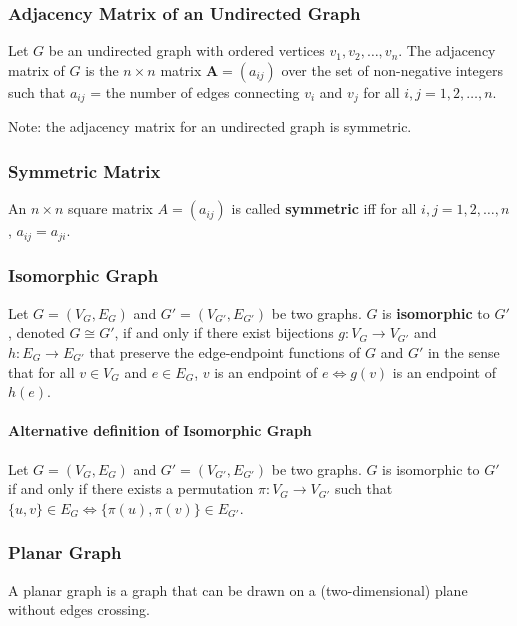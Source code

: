 \documentclass{article}
\theoremstyle{plain}
\theoremstyle{definition}
\theoremstyle{remark}
\begin{document}
\subsubsection*{Adjacency Matrix of an Undirected Graph}
Let $G$ be an undirected graph with ordered vertices $v_1, v_2, \dots, v_n$. The adjacency matrix of $G$ is the $n \times n$ matrix $\mathbf{A} = (a_{ij})$ over the set of non-negative integers such that $a_{ij}$ = the number of edges connecting $v_i$ and $v_j$ for all $i,j = 1,2,\dots,n$.
 
Note: the adjacency matrix for an undirected graph is symmetric.
 
\subsubsection*{Symmetric Matrix}
An $n \times n$ square matrix $A = (a_{ij})$ is called \textbf{symmetric} iff for all $i,j = 1,2,\dots,n$, $a_{ij} = a_{ji}$.


 
\subsubsection*{Isomorphic Graph}
Let $G = (V_G, E_G)$ and $G' = (V_{G'}, E_{G'})$ be two graphs. $G$ is \textbf{isomorphic} to $G'$, denoted $G \cong G'$, if and only if there exist bijections $g: V_G \to V_{G'}$ and $h: E_G \to E_{G'}$ that preserve the edge-endpoint functions of $G$ and $G'$ in the sense that for all $v \in V_G$ and $e \in E_G$, $v$ is an endpoint of $e \Leftrightarrow g(v)$ is an endpoint of $h(e)$.
 
\paragraph{Alternative definition of Isomorphic Graph} Let $G = (V_G, E_G)$ and $G' = (V_{G'}, E_{G'})$ be two graphs. $G$ is isomorphic to $G'$ if and only if there exists a permutation $\pi: V_G \to V_{G'}$ such that $\{u,v\} \in E_G \Leftrightarrow \{\pi(u), \pi(v)\} \in E_{G'}$.
 
\subsubsection*{Planar Graph}
A planar graph is a graph that can be drawn on a (two-dimensional) plane without edges crossing.
 
\end{document}
